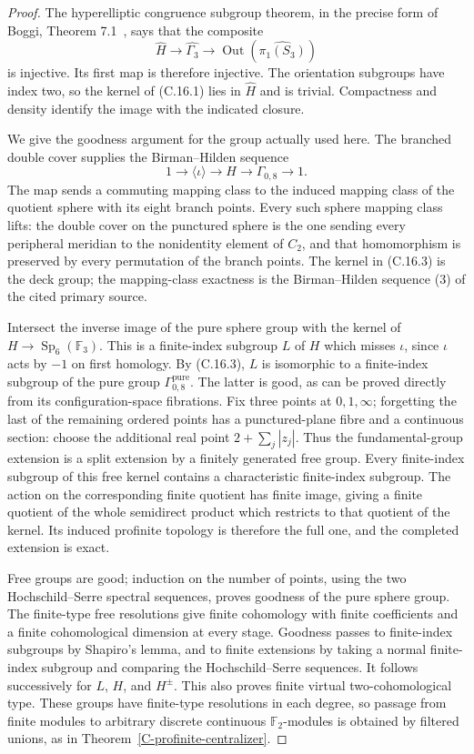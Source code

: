 \begin{proof}
The hyperelliptic congruence subgroup theorem, in the precise
form of Boggi, Theorem 7.1~\cite{CextraBoggiHyperelliptic}, says
that the composite
\[
 \widehat H\longrightarrow\widehat{\Gamma_3}
       \longrightarrow\operatorname{Out}
               (\widehat{\pi_1(S_3)})
\]
is injective. Its first map is therefore injective. The
orientation subgroups have index two, so the kernel of
(C.16.1) lies in $\widehat H$ and is trivial. Compactness and
density identify the image with the indicated closure.

We give the goodness argument for the group actually used here.
The branched double cover supplies the Birman--Hilden sequence
\[
 1\longrightarrow\langle\iota\rangle\longrightarrow H
       \longrightarrow\Gamma_{0,8}\longrightarrow1.
\tag{C.16.3}
\]
The map sends a commuting mapping class to the induced mapping
class of the quotient sphere with its eight branch points.
Every such sphere mapping class lifts: the double cover on the
punctured sphere is the one sending every peripheral meridian
to the nonidentity element of $C_2$, and that homomorphism is
preserved by every permutation of the branch points. The kernel
in (C.16.3) is the deck group; the mapping-class exactness is the
Birman--Hilden sequence (3) of the cited primary source.

Intersect the inverse image of the pure sphere group with the
kernel of $H\to\operatorname{Sp}_6(\mathbb F_3)$. This is a
finite-index subgroup $L$ of $H$ which misses $\iota$, since
$\iota$ acts by $-1$ on first homology. By (C.16.3), $L$ is
isomorphic to a finite-index subgroup of the pure group
$\Gamma_{0,8}^{\mathrm{pure}}$. The latter is good, as can be
proved directly from its configuration-space fibrations.
Fix three points at $0,1,\infty$; forgetting the last of the
remaining ordered points has a punctured-plane fibre and a
continuous section: choose the additional real point
$2+\sum_j|z_j|$. Thus the fundamental-group extension is a
split extension by a finitely generated free group. Every
finite-index subgroup of this free kernel contains a
characteristic finite-index subgroup. The action on the
corresponding finite quotient has finite image, giving a
finite quotient of the whole semidirect product which
restricts to that quotient of the kernel. Its induced
profinite topology is therefore the full one, and the
completed extension is exact.

Free groups are good; induction on the number of points,
using the two Hochschild--Serre spectral sequences, proves
goodness of the pure sphere group. The finite-type free
resolutions give finite cohomology with finite coefficients
and a finite cohomological dimension at every stage.
Goodness passes to finite-index subgroups by Shapiro's lemma,
and to finite extensions by taking a normal finite-index
subgroup and comparing the Hochschild--Serre sequences.
It follows successively for $L$, $H$, and $H^{\pm}$.
This also proves finite virtual two-cohomological type.
These groups have finite-type resolutions in each degree,
so passage from finite modules to arbitrary discrete
continuous $\mathbb F_2$-modules is obtained by filtered
unions, as in Theorem~\ref{C-profinite-centralizer}.


\end{proof}
